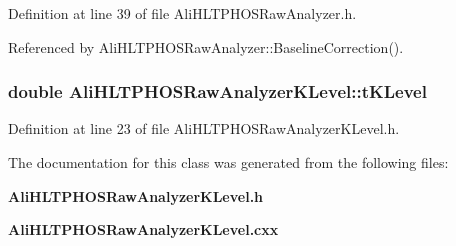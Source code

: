 Definition at line 39 of file Ali\-HLTPHOSRaw\-Analyzer.h.

Referenced by Ali\-HLTPHOSRaw\-Analyzer::Baseline\-Correction().
\subsubsection{\setlength{\rightskip}{0pt plus 5cm}double {\bf Ali\-HLTPHOSRaw\-Analyzer\-KLevel::t\-KLevel}\hspace{0.3cm}{\tt  [private]}}\label{classAliHLTPHOSRawAnalyzerKLevel_AliHLTPHOSRawAnalyzerKLevelr0}




Definition at line 23 of file Ali\-HLTPHOSRaw\-Analyzer\-KLevel.h.

The documentation for this class was generated from the following files:\begin{CompactItemize}
\item 
{\bf Ali\-HLTPHOSRaw\-Analyzer\-KLevel.h}\item 
{\bf Ali\-HLTPHOSRaw\-Analyzer\-KLevel.cxx}\end{CompactItemize}
